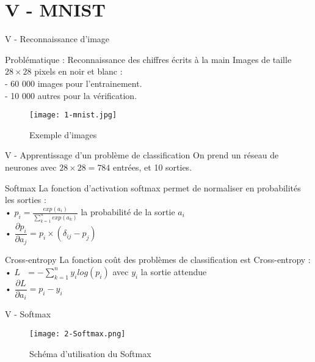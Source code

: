
\section{V - MNIST}
\begin{frame}{V - Reconnaissance d'image}
	\begin{block}{Problématique : Reconnaissance des chiffres écrits à la main}
		Images de taille $28 \times 28$ pixels en noir et blanc : \\
		\quad - 60 000 images pour l'entrainement. \\
		\quad - 10 000 autres pour la vérification.
	\end{block}
	\begin{figure}
		\centering
		\texttt{[image: 1-mnist.jpg]}
		\caption{Exemple d'images}
	\end{figure}
\end{frame}


\begin{frame}{V - Apprentissage d'un problème de classification}
	On prend un réseau de neurones avec $28 \times 28 = 784$ entrées, et 10 sorties. \\
	\begin{block}{Softmax}
		La fonction d'activation softmax permet de normaliser en probabilités les sorties : \\
		• $p_i = \frac{exp(a_i)}{\sum_{k=1}^{n}exp(a_k)}$ la probabilité de la sortie $a_i$ \\
		• $\dfrac{\partial p_i}{\partial a_j} = p_i\times(\delta_{ij}-p_j)$ \\
	\end{block}
	\begin{block}{Cross-entropy}
		La fonction coût des problèmes de classification est Cross-entropy : \\
		• $L\ \ \ = -\sum_{k=1}^{n}y_ilog(p_i)$ avec $y_i$ la sortie attendue \\
		• $\dfrac{\partial L}{\partial a_i} = p_i - y_i$
	\end{block}
\end{frame}


\begin{frame}{V - Softmax}
	\begin{figure}
		\centering
		\texttt{[image: 2-Softmax.png]}
		\caption{Schéma d'utilisation du Softmax}
	\end{figure}
\end{frame}


